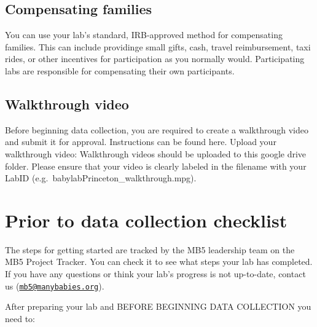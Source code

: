 \documentclass[
]{book}
\begin{document}
\hypertarget{compensating-families-1}{%
\section{Compensating families}\label{compensating-families-1}}

You can use your lab's standard, IRB-approved method for compensating families. This can include providinge small gifts, cash, travel reimbursement, taxi rides, or other incentives for participation as you normally would. Participating labs are responsible for compensating their own participants.

\hypertarget{walkthrough-video-1}{%
\section{Walkthrough video}\label{walkthrough-video-1}}

Before beginning data collection, you are required to create a walkthrough video and submit it for approval. Instructions can be found here.
Upload your walkthrough video:
Walkthrough videos should be uploaded to this google drive folder. Please ensure that your video is clearly labeled in the filename with your LabID (e.g.~babylabPrinceton\_walkthrough.mpg).

\hypertarget{prior-to-data-collection-checklist}{%
\chapter{Prior to data collection checklist}\label{prior-to-data-collection-checklist}}

The steps for getting started are tracked by the MB5 leadership team on the MB5 Project Tracker. You can check it to see what steps your lab has completed. If you have any questions or think your lab's progress is not up-to-date, contact us (\href{mailto:mb5@manybabies.org}{\nolinkurl{mb5@manybabies.org}}).

After preparing your lab and BEFORE BEGINNING DATA COLLECTION you need to:
\end{document}
